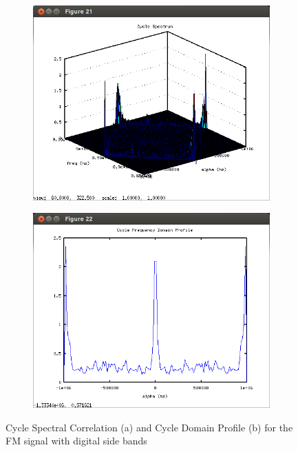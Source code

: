 \begin{figure}
\centering
\begin{subfigure}{.49\textwidth}
\centering
\includegraphics[width=\linewidth]{../img/Report_Cycle_Spectral_Corr_88_5}

  \caption{ }
\end{subfigure}
\begin{subfigure}{.49\textwidth}
  \centering
  \includegraphics[width=\linewidth]{../img/Report_CDP_885.png}

  \caption{ }
\end{subfigure}
\caption{Cycle Spectral Correlation (a) and Cycle Domain Profile (b)
for the FM signal with digital side bands}
\label{fig:cycleSpec885}
\end{figure}